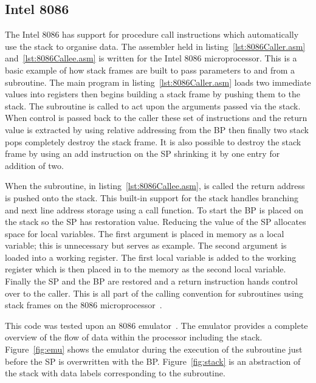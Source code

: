 \documentclass[12pt,a4paper]{article}
\begin{document}
\subsection{Intel 8086}
\label{8086}
The Intel 8086 has support for procedure call instructions which automatically use the stack to organise data.
The assembler held in listing~\ref{lst:8086Caller.asm} and~\ref{lst:8086Callee.asm} is written for the Intel 8086 microprocessor.
This is a basic example of how stack frames are built to pass parameters to and from a subroutine.
The main program in listing~\ref{lst:8086Caller.asm} loads two immediate values into registers then begins building a stack frame by pushing them to the stack.  
The subroutine is called to act upon the arguments passed via the stack.
When control is passed back to the caller these set of instructions and the return value is extracted by using relative addressing from the BP then finally two stack pops completely destroy the stack frame.
It is also possible to destroy the stack frame by using an add instruction on the SP shrinking it by one entry for addition of two.
\newpage




When the subroutine, in listing~\ref{lst:8086Callee.asm}, is called the return address is pushed onto the stack.
This built-in support for the stack handles branching and next line address storage using a call function.
To start the BP is placed on the stack so the SP has restoration value.
Reducing the value of the SP allocates space for local variables.
The first argument is placed in memory as a local variable; this is unnecessary but serves as example.
The second argument is loaded into a working register.
The first local variable is added to the working register which is then placed in to the memory as the second local variable.
Finally the SP and the BP are restored and a return instruction hands control over to the caller. 
This is all part of the calling convention for subroutines using stack frames on the 8086 microprocessor~\cite{8086call}.
 




This code was tested upon an 8086 emulator~\cite{emu8086}.
The emulator provides a complete overview of the flow of data within the processor including the stack. 
Figure~\ref{fig:emu} shows the emulator during the execution of the subroutine just before the SP is overwritten with the BP.
Figure~\ref{fig:stack} is an abstraction of the stack with data labels corresponding to the subroutine. 
\end{document}
